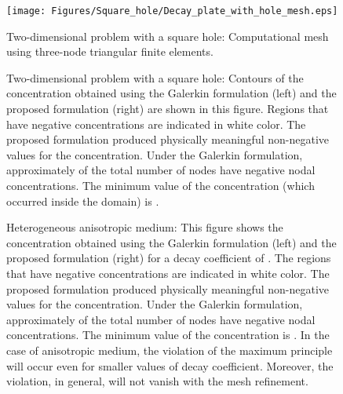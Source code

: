 \documentclass[11pt]{amsart}
\begin{document}
\clearpage
\newpage

\begin{figure}[!h]
  \centering
  \texttt{[image: Figures/Square\_hole/Decay\_plate\_with\_hole\_mesh.eps]}       
\caption{Two-dimensional problem with a square hole: Computational mesh using 
    three-node triangular finite elements.} \label{Fig:Decay_plate_with_hole_mesh}
\end{figure}

\begin{figure}[!h]
  \centering
\caption{Two-dimensional problem with a square hole: Contours of the concentration 
    obtained using the Galerkin formulation (left) and the proposed formulation 
    (right) are shown in this figure. Regions that have negative concentrations 
    are indicated in white color. The proposed formulation produced physically 
    meaningful non-negative values for the concentration. Under the Galerkin 
    formulation, approximately  of the total number of nodes have 
    negative nodal concentrations. The minimum value of the concentration 
    (which occurred inside the domain) is .} 
  \label{Fig:Decay_plate_with_hole_NR}
\end{figure}

\clearpage
\newpage

\begin{figure}[htbp]
  \centering
\caption{Heterogeneous anisotropic medium: This figure shows the concentration obtained 
      using the Galerkin formulation (left) and the proposed formulation (right) for a decay 
      coefficient of . The regions that have negative concentrations are indicated 
      in white color. The proposed formulation produced physically meaningful non-negative 
      values for the concentration. Under the Galerkin formulation, approximately  
      of the total number of nodes have negative nodal concentrations. The minimum value of 
      the concentration is . In the case of anisotropic medium, the violation 
      of the maximum principle will occur even for smaller values of decay coefficient. 
      Moreover, the violation, in general, will not vanish with the mesh refinement.} 
    \label{Fig:Decay_2D_T3_heterogeneous}
\end{figure}
\end{document}
